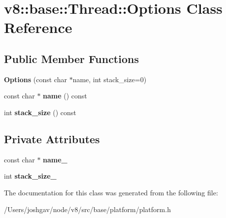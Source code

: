 \hypertarget{classv8_1_1base_1_1_thread_1_1_options}{}\section{v8\+:\+:base\+:\+:Thread\+:\+:Options Class Reference}
\label{classv8_1_1base_1_1_thread_1_1_options}
\subsection*{Public Member Functions}
\begin{DoxyCompactItemize}
\item 
{\bfseries Options} (const char $\ast$name, int stack\+\_\+size=0)\hypertarget{classv8_1_1base_1_1_thread_1_1_options_af649d5e596f4538bb03ca8ea95bbf969}{}\label{classv8_1_1base_1_1_thread_1_1_options_af649d5e596f4538bb03ca8ea95bbf969}

\item 
const char $\ast$ {\bfseries name} () const \hypertarget{classv8_1_1base_1_1_thread_1_1_options_a2a78593456ff3a34190a172d8e234340}{}\label{classv8_1_1base_1_1_thread_1_1_options_a2a78593456ff3a34190a172d8e234340}

\item 
int {\bfseries stack\+\_\+size} () const \hypertarget{classv8_1_1base_1_1_thread_1_1_options_a33ba523ee8e58918ff469647e52caa8a}{}\label{classv8_1_1base_1_1_thread_1_1_options_a33ba523ee8e58918ff469647e52caa8a}

\end{DoxyCompactItemize}
\subsection*{Private Attributes}
\begin{DoxyCompactItemize}
\item 
const char $\ast$ {\bfseries name\+\_\+}\hypertarget{classv8_1_1base_1_1_thread_1_1_options_a41513d98036d81eddfbdcbb82bbff75e}{}\label{classv8_1_1base_1_1_thread_1_1_options_a41513d98036d81eddfbdcbb82bbff75e}

\item 
int {\bfseries stack\+\_\+size\+\_\+}\hypertarget{classv8_1_1base_1_1_thread_1_1_options_ac9e4006c6e1a4d76a5d88e7a50db86a7}{}\label{classv8_1_1base_1_1_thread_1_1_options_ac9e4006c6e1a4d76a5d88e7a50db86a7}

\end{DoxyCompactItemize}


The documentation for this class was generated from the following file\+:\begin{DoxyCompactItemize}
\item 
/\+Users/joshgav/node/v8/src/base/platform/platform.\+h\end{DoxyCompactItemize}
